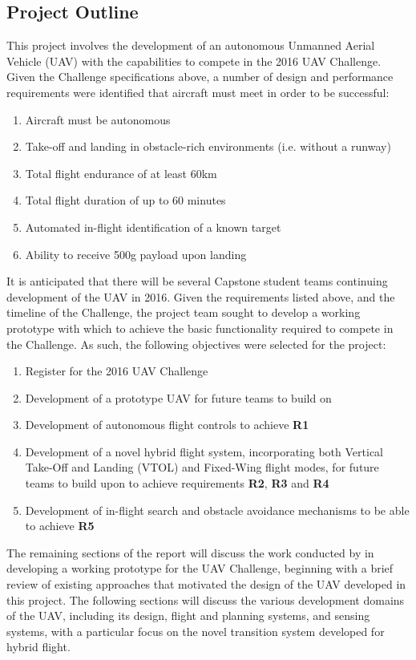 \subsection{Project Outline}
This project involves the development of an autonomous Unmanned Aerial Vehicle (UAV) with the capabilities to compete in the 2016 UAV Challenge. Given the Challenge specifications above, a number of design and performance requirements were identified that aircraft must meet in order to be successful:
\begin{enumerate}[label=\bfseries R\arabic*:] \itemsep-2pt
	\item Aircraft must be autonomous
	\item Take-off and landing in obstacle-rich environments (i.e. without a runway)
	\item Total flight endurance of at least 60km
	\item Total flight duration of up to 60 minutes
	\item Automated in-flight identification of a known target
	\item Ability to receive 500g payload upon landing
\end{enumerate}

It is anticipated that there will be several Capstone student teams continuing development of the UAV in 2016. Given the requirements listed above, and the timeline of the Challenge, the \ID project team sought to develop a working prototype with which to achieve the basic functionality required to compete in the Challenge. As such, the following objectives were selected for the project:
\begin{enumerate}[label=\bfseries O\arabic*:] \itemsep-2pt
	\item Register for the 2016 UAV Challenge
	\item Development of a prototype UAV for future teams to build on
	\item Development of autonomous flight controls to achieve \textbf{R1}
	\item Development of a novel hybrid flight system, incorporating both Vertical Take-Off and Landing (VTOL) and Fixed-Wing flight modes, for future teams to build upon to achieve requirements \textbf{R2}, \textbf{R3} and \textbf{R4}
	\item Development of in-flight search and obstacle avoidance mechanisms to be able to achieve \textbf{R5}
\end{enumerate}

The remaining sections of the report will discuss the work conducted by \ID in developing a working prototype for the UAV Challenge, beginning with a brief review of existing approaches that motivated the design of the UAV developed in this project. The following sections will discuss the various development domains of the UAV, including its design, flight and planning systems, and sensing systems, with a particular focus on the novel transition system developed for hybrid flight.

